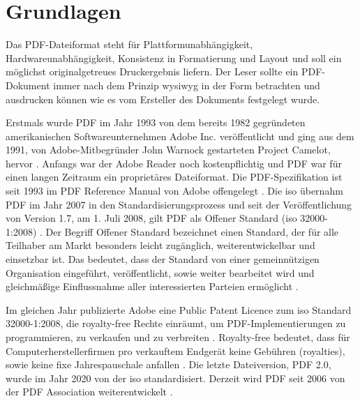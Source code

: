 \chapter{Grundlagen}
Das PDF-Dateiformat steht für Plattformunabhängigkeit, Hardwareunabhängigkeit, Konsistenz in Formatierung und Layout und soll ein möglichst originalgetreues Druckergebnis liefern. Der Leser sollte ein PDF-Dokument immer nach dem Prinzip \gls{wysiwyg} in der Form betrachten und ausdrucken können wie es vom Ersteller des Dokuments festgelegt wurde.
\par
Erstmals wurde PDF im Jahr 1993 von dem bereits 1982 gegründeten amerikanischen Softwareunternehmen Adobe Inc. veröffentlicht und ging aus dem 1991, von Adobe-Mitbegründer John Warnock gestarteten Project Camelot, hervor \cite{wiki-pdf-de}. Anfangs war der Adobe Reader noch kostenpflichtig und PDF war für einen langen Zeitraum ein proprietäres Dateiformat. Die PDF-Spezifikation ist seit 1993 im PDF Reference Manual von Adobe offengelegt \cite{wiki-pdf-engl}. Die \gls{iso} übernahm PDF im Jahr 2007 in den Standardisierungsprozess und seit der Veröffentlichung von Version 1.7, am 1. Juli 2008, gilt PDF als Offener Standard (\gls{iso} 32000-1:2008) \cite{wiki-pdf-de, wiki-pdf-engl}. Der Begriff Offener Standard bezeichnet einen Standard, der für alle Teilhaber am Markt besonders leicht zugänglich, weiterentwickelbar und einsetzbar ist. Das bedeutet, dass der Standard von einer gemeinnützigen Organisation eingeführt, veröffentlicht, sowie weiter bearbeitet wird und gleichmäßige Einflussnahme aller interessierten Parteien ermöglicht \cite{wiki-standard}.
\par
Im gleichen Jahr publizierte Adobe eine Public Patent Licence zum \gls{iso} Standard 32000-1:2008, die royalty-free Rechte einräumt, um PDF-Implementierungen zu programmieren, zu verkaufen und zu verbreiten \cite{wiki-pdf-engl}. Royalty-free bedeutet, dass für Computerherstellerfirmen pro verkauftem Endgerät keine Gebühren (royalties), sowie keine fixe Jahrespauschale anfallen \cite{wiki-roy-free}. Die letzte Dateiversion, PDF 2.0, wurde im Jahr 2020 von der \gls{iso} standardisiert. Derzeit wird PDF seit 2006 von der PDF Association weiterentwickelt \cite{wiki-pdf-de}. 









